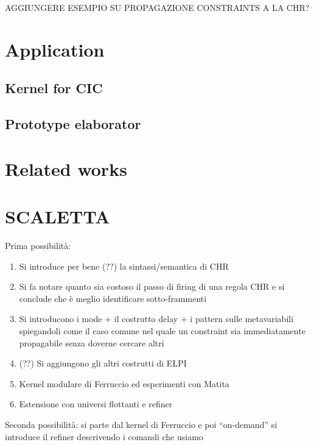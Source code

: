\documentclass{easychair}
\begin{document}
AGGIUNGERE ESEMPIO SU PROPAGAZIONE CONSTRAINTS A LA CHR?

\section{Application}

\subsection{Kernel for CIC}



\subsection{Prototype elaborator}


\section{Related works}

\section{SCALETTA}

Prima possibilità:
\begin{enumerate}
\item Si introduce per bene (??) la sintassi/semantica di CHR
\item Si fa notare quanto sia costoso il passo di firing di una regola CHR
      e si conclude che è meglio identificare sotto-frammenti
\item Si introducono i mode + il costrutto delay + i pattern sulle metavariabili
      spiegandoli come il caso comune nel quale un constraint sia immediatamente
      propagabile senza doverne cercare altri
\item (??) Si aggiungono gli altri costrutti di ELPI
\item Kernel modulare di Ferruccio ed esperimenti con Matita
\item Estensione con universi flottanti e refiner
\end{enumerate}

Seconda possibilità: si parte dal kernel di Ferruccio e poi ``on-demand'' si introduce il refiner descrivendo i comandi che usiamo 

\label{sect:bib}


\end{document}
